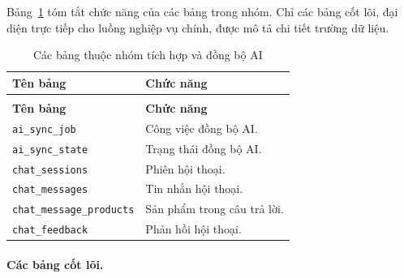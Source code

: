 Bảng~\ref{tab:data-summary-ai-integration} tóm tắt chức năng của các bảng trong nhóm. Chỉ các bảng cốt lõi, đại diện trực tiếp cho luồng nghiệp vụ chính, được mô tả chi tiết trường dữ liệu.

\begin{longtable}{|>{\RaggedRight\arraybackslash}p{}|>{\RaggedRight\arraybackslash}p{}|}
    \caption{Các bảng thuộc nhóm tích hợp và đồng bộ AI}
    \label{tab:data-summary-ai-integration} \\
    \hline
    \textbf{Tên bảng} & \textbf{Chức năng} \\
    \hline
    \endfirsthead
    \multicolumn{2}{c}{\tablename\ \thetable\ (tiếp theo)} \\
    \hline
    \textbf{Tên bảng} & \textbf{Chức năng} \\
    \hline
    \endhead
    \texttt{ai\_sync\_job} & Công việc đồng bộ AI. \\
    \hline
    \texttt{ai\_sync\_state} & Trạng thái đồng bộ AI. \\
    \hline
    \texttt{chat\_sessions} & Phiên hội thoại. \\
    \hline
    \texttt{chat\_messages} & Tin nhắn hội thoại. \\
    \hline
    \texttt{chat\_message\_products} & Sản phẩm trong câu trả lời. \\
    \hline
    \texttt{chat\_feedback} & Phản hồi hội thoại. \\
    \hline
\end{longtable}

\paragraph{Các bảng cốt lõi.}


